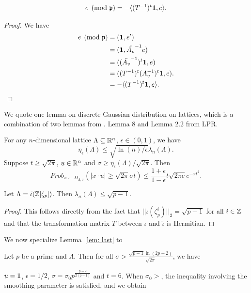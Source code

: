 \documentclass{amsart}
\begin{document}
\begin{Lemma}
\[
e\pmod{\mathfrak{p}} = -\langle (T^{-1})^{t} {\bf 1}, e \rangle.
\]
\end{Lemma}
\begin{proof}
We have
\begin{align*}
e\pmod{\mathfrak{p}}  &= ({\bf 1}, e') \\
&=  ({\bf 1},  \tilde{A_v}^{-1} e) \\
& = ((\tilde{A_v}^{-1})^t {\bf 1}, e) \\
& = ((T^{-1})^{t} (A_v^{-1})^t{\bf 1}, e). \\
& = -\langle (T^{-1})^{t} {\bf 1}, e \rangle.
\end{align*}
\end{proof}

We quote one lemma on discrete Gaussian distribution on lattices, which is a combination of two lemmas from \cite{langlois2014worst}. Lemma 8 and Lemma 2.2  from LPR.
\begin{Lemma}
\label{lem: last}
For any $n$-dimensional lattice $\Lambda \subseteq \mathbb{R}^n$, $\epsilon \in (0,1)$, we have
$$\eta_\epsilon(\Lambda) \leq \sqrt{\ln(n)/\epsilon} \lambda_n(\Lambda).$$
Suppose $t \geq \sqrt{2 \pi}$, $u \in \mathbb{R}^n$ and $\sigma \geq \eta_\epsilon(\Lambda)/\sqrt{2 \pi}$. Then
\[
    Prob_{x \gets D_{\Lambda,\sigma}}(|x \cdot u| \geq \sqrt{2 \pi}\sigma t) \leq \frac{1+\epsilon}{1-\epsilon} t \sqrt{2 \pi e} e^{- \pi t^2}.
\]
\end{Lemma}


\begin{Lemma}
Let $\Lambda = \tilde{\iota}(\mathbb{Z}[\zeta_p])$. Then $\lambda_n(\Lambda) \leq \sqrt{p-1}$.
\end{Lemma}

\begin{proof}
This follows directly from the fact that $||\iota(\zeta_p^i)||_2 = \sqrt{p-1}$ for all $i \in \mathbb{Z}$ and that the transformation matrix $T$ between $\iota$ and $\tilde{\iota}$ is Hermitian.
\end{proof}


We now specialize Lemma~\ref{lem: last} to

\begin{Prop}
Let $p$ be a prime and $\Lambda$. Then for all $\sigma > \frac{\sqrt{p-1} \ln(2p-2)}{\sqrt{2 \pi}}$, we have
\end{Prop}
$u = {\bf 1}$, $\epsilon = 1/2$, $\sigma = \sigma_0 p^{\frac{p-2}{2(p-1)}}$ and $t = 6$. When $\sigma_0 > $, the inequality involving the smoothing parameter is satisfied, and we obtain
\end{document}
